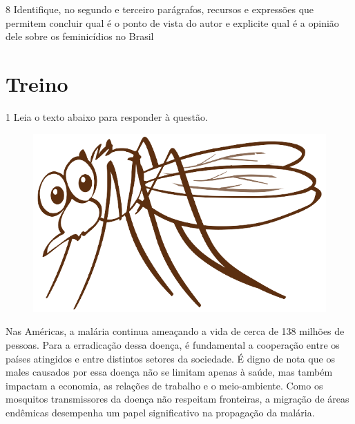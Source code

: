 \num{8} Identifique, no segundo e terceiro parágrafos, recursos e expressões que permitem 
concluir qual é o ponto de vista do autor e explicite qual é a opinião dele sobre os feminicídios 
no Brasil   


\section*{Treino}

\num{1} Leia o texto abaixo para responder à questão.

\begin{myquote}

\begin{figure}[H]
\centering
\includegraphics[scale=0.35]{./imgSAEB_7_POR/media/image26.png}
\end{figure}

Nas Américas, a malária continua ameaçando a vida de cerca de 138 milhões de pessoas.
Para a erradicação dessa doença, é fundamental a cooperação entre os países atingidos e 
entre distintos setores da sociedade. É digno de nota que os males causados por essa doença
não se limitam apenas à saúde, mas também impactam a economia, as relações de trabalho e 
o meio-ambiente. Como os mosquitos transmissores da doença não respeitam fronteiras, a migração
de áreas endêmicas desempenha um papel significativo na propagação da malária. 


\end{myquote}

